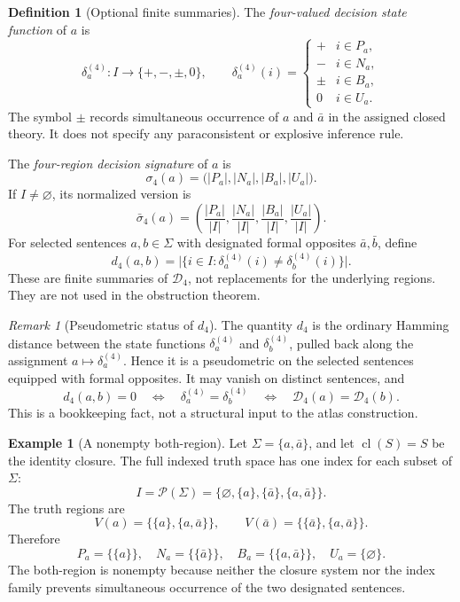 \documentclass[11pt]{amsart}
\numberwithin{equation}{section}
\theoremstyle{plain}
\theoremstyle{definition}
\newtheorem{definition}[theorem]{Definition}
\newtheorem{example}[theorem]{Example}
\theoremstyle{remark}
\newtheorem{remark}[theorem]{Remark}
\newcommand{\Pow}{\mathcal P}
\newcommand{\Cl}{\operatorname{cl}}
\newcommand{\Sig}{\Sigma}
\begin{document}
\begin{definition}[Optional finite summaries]
\label{def:decision-summaries}
The \emph{four-valued decision state function} of \(a\) is
\[
  \delta_a^{(4)}:I\to\{+,-,\pm,0\},
  \qquad
  \delta_a^{(4)}(i)=
  \begin{cases}
  + & i\in P_a,\\
  - & i\in N_a,\\
  \pm & i\in B_a,\\
  0 & i\in U_a.
  \end{cases}
\]
The symbol \(\pm\) records simultaneous occurrence of \(a\) and \(\bar a\) in the assigned closed theory.  It does not specify any paraconsistent or explosive inference rule.

The \emph{four-region decision signature} of \(a\) is
\[
  \sigma_4(a)=\bigl(|P_a|,|N_a|,|B_a|,|U_a|\bigr).
\]
If \(I\neq\varnothing\), its normalized version is
\[
  \bar\sigma_4(a)=
  \left(
  \frac{|P_a|}{|I|},
  \frac{|N_a|}{|I|},
  \frac{|B_a|}{|I|},
  \frac{|U_a|}{|I|}
  \right).
\]
For selected sentences \(a,b\in\Sig\) with designated formal opposites \(\bar a,\bar b\), define
\[
  d_4(a,b)=\bigl|\{i\in I: \delta_a^{(4)}(i)\neq\delta_b^{(4)}(i)\}\bigr|.
\]
These are finite summaries of \(\mathcal D_4\), not replacements for the underlying regions.  They are not used in the obstruction theorem.
\end{definition}

\begin{remark}[Pseudometric status of \(d_4\)]
The quantity \(d_4\) is the ordinary Hamming distance between the state functions \(\delta_a^{(4)}\) and \(\delta_b^{(4)}\), pulled back along the assignment \(a\mapsto\delta_a^{(4)}\).  Hence it is a pseudometric on the selected sentences equipped with formal opposites.  It may vanish on distinct sentences, and
\[
  d_4(a,b)=0
  \quad\Longleftrightarrow\quad
  \delta_a^{(4)}=\delta_b^{(4)}
  \quad\Longleftrightarrow\quad
  \mathcal D_4(a)=\mathcal D_4(b).
\]
This is a bookkeeping fact, not a structural input to the atlas construction.
\end{remark}

\begin{example}[A nonempty both-region]
\label{ex:nonempty-both-region}
Let \(\Sig=\{a,\bar a\}\), and let \(\Cl(S)=S\) be the identity closure.  The full indexed truth space has one index for each subset of \(\Sig\):
\[
  I=\Pow(\Sig)=\{\varnothing,\{a\},\{\bar a\},\{a,\bar a\}\}.
\]
The truth regions are
\[
  V(a)=\{\{a\},\{a,\bar a\}\},
  \qquad
  V(\bar a)=\{\{\bar a\},\{a,\bar a\}\}.
\]
Therefore
\[
  P_a=\{\{a\}\},\quad
  N_a=\{\{\bar a\}\},\quad
  B_a=\{\{a,\bar a\}\},\quad
  U_a=\{\varnothing\}.
\]
The both-region is nonempty because neither the closure system nor the index family prevents simultaneous occurrence of the two designated sentences.
\end{example}
\end{document}

